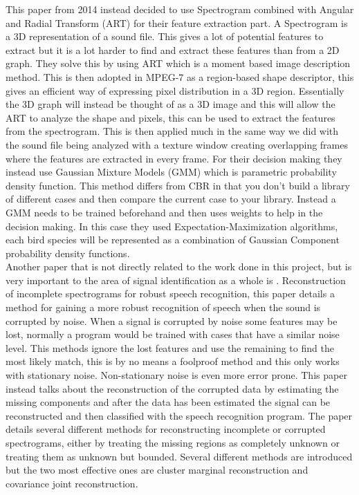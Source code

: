This paper from 2014 \cite{danne1} instead decided to use Spectrogram combined with
Angular and Radial Transform (ART) for their feature extraction part. A
Spectrogram is a 3D representation of a sound file. This gives a lot of
potential features to extract but it is a lot harder to find and extract
these features than from a 2D graph. They solve this by using ART which is a
moment based image description method. This is then adopted in MPEG-7 as a
region-based shape descriptor, this gives an efficient way of expressing pixel
distribution in a 3D region. Essentially the 3D graph will instead be thought
of as a 3D image and this will allow the ART to analyze the shape and pixels,
this can be used to extract the features from the spectrogram. This is then
applied much in the same way we did with the sound file being analyzed with a
texture window creating overlapping frames where the features are extracted in
every frame. For their decision making they instead use Gaussian Mixture Models
(GMM) which is parametric probability density function. This method differs
from CBR in that you don't build a library of different cases and then compare
the current case to your library. Instead a GMM needs to be trained beforehand
and then uses weights to help in the decision making. In this case they used
Expectation-Maximization algorithms, each bird species will be represented as
a combination of Gaussian Component probability density functions.\\

Another paper that is not directly related to the work done in this project,
but is very important to the area of signal identification as a whole is \cite{1566472}.
Reconstruction of incomplete spectrograms for robust speech recognition, this
paper details a method for gaining a more robust recognition of speech when the
sound is corrupted by noise. When a signal is corrupted by noise some features
may be lost, normally a program would be trained with cases that have a similar
noise level. This methods ignore the lost features and use the remaining to
find the most likely match, this is by no means a foolproof method and this
only works with stationary noise. Non-stationary noise is even more error prone.
 This paper instead talks about the reconstruction of the corrupted data by
 estimating the missing components and after the data has been estimated the
 signal can be reconstructed and then classified with the speech recognition
 program. The paper details several different methods for reconstructing
 incomplete or corrupted spectrograms, either by treating the missing regions
 as completely unknown or treating them as unknown but bounded. Several
 different methods are introduced but the two most effective ones are cluster
 marginal reconstruction and covariance joint reconstruction.\\
 
